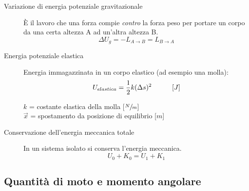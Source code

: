 \documentclass[a4paper,11pt,italian]{article}
\begin{document}
\begin{description}
  \item[Variazione di energia potenziale gravitazionale] 
  È il lavoro che una forza compie \emph{contro} la forza peso per portare un corpo da una certa altezza A ad un'altra altezza B. 
  \[ \Delta U_g = -L_{A\rightarrow B} = L_{B\rightarrow A} \]
  
  \item[Energia potenziale elastica] 
  Energia immagazzinata in un corpo elastico (ad esempio una molla):
  \[ U_{elastica} = \frac{1}{2} k (\Delta s)^2 \hspace*{3em} [J] \]
  \begin{multicols}{2}
  $ k $ = costante elastica della molla [$ \sfrac{N}{m} $]\\
  $ \vec{x} $ = spostamento da posizione di equilibrio [$ m $]
  \end{multicols}
  
  \item[Conservazione dell'energia meccanica totale] 
  In un sistema isolato si conserva l'energia meccanica. 
  \[ U_0 + K_0 = U_1 + K_1 \]
\end{description}



\subsection{Quantità di moto e momento angolare}
\end{document}
